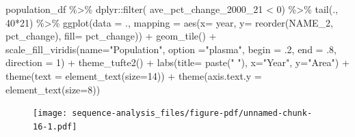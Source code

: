\documentclass[
  letterpaper,
  DIV=11,
  numbers=noendperiod]{scrreprt}
\newenvironment{Shaded}{\begin{snugshade}}{\end{snugshade}}
\newcommand{\AttributeTok}[1]{\textcolor[rgb]{0.40,0.45,0.13}{#1}}
\newcommand{\DecValTok}[1]{\textcolor[rgb]{0.68,0.00,0.00}{#1}}
\newcommand{\FunctionTok}[1]{\textcolor[rgb]{0.28,0.35,0.67}{#1}}
\newcommand{\NormalTok}[1]{\textcolor[rgb]{0.00,0.23,0.31}{#1}}
\newcommand{\SpecialCharTok}[1]{\textcolor[rgb]{0.37,0.37,0.37}{#1}}
\newcommand{\StringTok}[1]{\textcolor[rgb]{0.13,0.47,0.30}{#1}}
\begin{document}
\begin{Shaded}
\begin{Highlighting}[]
\NormalTok{population\_df }\SpecialCharTok{\%\textgreater{}\%}\NormalTok{ dplyr}\SpecialCharTok{::}\FunctionTok{filter}\NormalTok{( ave\_pct\_change\_2000\_21 }\SpecialCharTok{\textless{}} \DecValTok{0}\NormalTok{) }\SpecialCharTok{\%\textgreater{}\%} 
  \FunctionTok{tail}\NormalTok{(., }\DecValTok{40}\SpecialCharTok{*}\DecValTok{21}\NormalTok{) }\SpecialCharTok{\%\textgreater{}\%} 
  \FunctionTok{ggplot}\NormalTok{(}\AttributeTok{data =}\NormalTok{ ., }
           \AttributeTok{mapping =} \FunctionTok{aes}\NormalTok{(}\AttributeTok{x=}\NormalTok{ year, }\AttributeTok{y=} \FunctionTok{reorder}\NormalTok{(NAME\_2, pct\_change), }\AttributeTok{fill=}\NormalTok{ pct\_change)) }\SpecialCharTok{+}
  \FunctionTok{geom\_tile}\NormalTok{() }\SpecialCharTok{+}
  \FunctionTok{scale\_fill\_viridis}\NormalTok{(}\AttributeTok{name=}\StringTok{"Population"}\NormalTok{, }\AttributeTok{option =}\StringTok{"plasma"}\NormalTok{, }\AttributeTok{begin =}\NormalTok{ .}\DecValTok{2}\NormalTok{, }\AttributeTok{end =}\NormalTok{ .}\DecValTok{8}\NormalTok{, }\AttributeTok{direction =} \DecValTok{1}\NormalTok{) }\SpecialCharTok{+}
  \FunctionTok{theme\_tufte2}\NormalTok{() }\SpecialCharTok{+}
  \FunctionTok{labs}\NormalTok{(}\AttributeTok{title=} \FunctionTok{paste}\NormalTok{(}\StringTok{" "}\NormalTok{), }\AttributeTok{x=}\StringTok{"Year"}\NormalTok{, }\AttributeTok{y=}\StringTok{"Area"}\NormalTok{) }\SpecialCharTok{+}
  \FunctionTok{theme}\NormalTok{(}\AttributeTok{text =} \FunctionTok{element\_text}\NormalTok{(}\AttributeTok{size=}\DecValTok{14}\NormalTok{)) }\SpecialCharTok{+} 
  \FunctionTok{theme}\NormalTok{(}\AttributeTok{axis.text.y =} \FunctionTok{element\_text}\NormalTok{(}\AttributeTok{size=}\DecValTok{8}\NormalTok{))}
\end{Highlighting}
\end{Shaded}

\begin{figure}[H]

{\centering \texttt{[image: sequence-analysis\_files/figure-pdf/unnamed-chunk-16-1.pdf]}

}

\end{figure}
\end{document}
